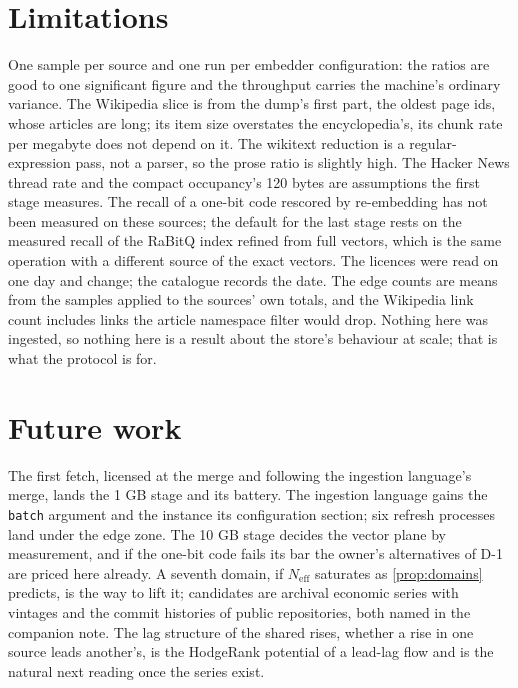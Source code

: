 \documentclass[11pt]{article}
\theoremstyle{plain}
\theoremstyle{definition}
\theoremstyle{remark}
\newcommand{\code}[1]{\texttt{#1}}
\newcommand{\Neff}{N_{\mathrm{eff}}}
\begin{document}
\section{Limitations}
One sample per source and one run per embedder configuration: the ratios are good to one
significant figure and the throughput carries the machine's ordinary variance. The Wikipedia slice
is from the dump's first part, the oldest page ids, whose articles are long; its item size overstates
the encyclopedia's, its chunk rate per megabyte does not depend on it. The wikitext reduction is a
regular-expression pass, not a parser, so the prose ratio is slightly high. The Hacker News thread
rate and the compact occupancy's 120 bytes are assumptions the first stage measures. The recall of
a one-bit code rescored by re-embedding has not been measured on these sources; the default for
the last stage rests on the measured recall of the RaBitQ index refined from full vectors, which is
the same operation with a different source of the exact vectors. The licences were read on one day
and change; the catalogue records the date. The edge counts are means from the samples applied to
the sources' own totals, and the Wikipedia link count includes links the article namespace filter
would drop. Nothing here was ingested, so nothing here is a result about the store's behaviour at
scale; that is what the protocol is for.

\section{Future work}
The first fetch, licensed at the merge and following the ingestion language's merge, lands the
1 GB stage and its battery. The ingestion language gains the \code{batch} argument and the
instance its configuration section; six refresh processes land under the edge zone. The 10 GB stage
decides the vector plane by measurement, and if the one-bit code fails its bar the owner's
alternatives of D-1 are priced here already. A seventh domain, if $\Neff$ saturates as
\cref{prop:domains} predicts, is the way to lift it; candidates are archival economic series with
vintages and the commit histories of public repositories, both named in the companion note. The
lag structure of the shared rises, whether a rise in one source leads another's, is the HodgeRank
potential of a lead-lag flow and is the natural next reading once the series exist.
\end{document}
